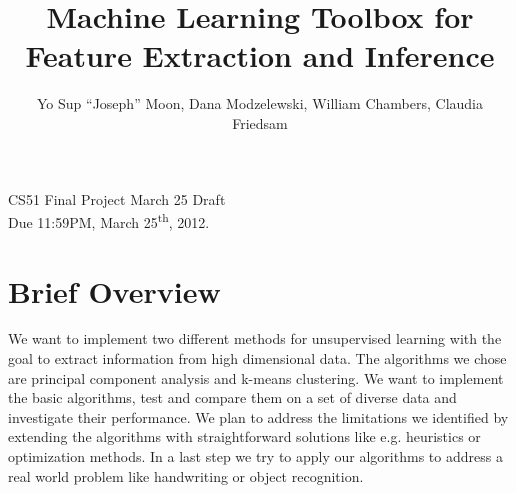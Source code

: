 \documentclass[12pt]{article} %
\title{Machine Learning Toolbox for Feature Extraction and Inference}
\author{Yo Sup ``Joseph'' Moon, Dana Modzelewski, William Chambers, Claudia Friedsam}
\begin{document}
\maketitle


\begin{center}
CS51 Final Project March 25 Draft \\
Due 11:59PM, March 25\textsuperscript{th}, 2012.  
\end{center}


\section{Brief Overview}
 
We want to implement two different methods for unsupervised learning with the goal to extract information from high dimensional data. The algorithms we chose are principal component analysis and k-means clustering.
We want to implement the basic algorithms, test and compare them on a set of diverse data and investigate their performance. We plan to address the limitations we identified by extending the algorithms with straightforward solutions like e.g. heuristics or optimization methods.
In a last step we try to apply our algorithms to address a real world problem like handwriting or object recognition.
\end{document}
